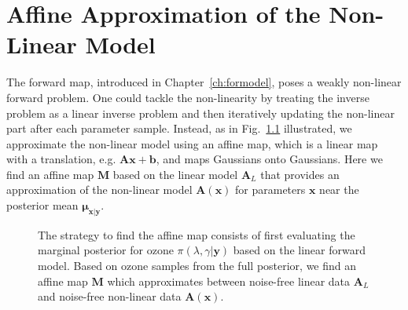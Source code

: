 \chapter{Affine Approximation of the Non-Linear Model}
\label{ch:affine}
\thispagestyle{empty}
\newcommand*{\vertbar}{\rule[-1ex]{0.5pt}{2.5ex}}
\newcommand*{\horzbar}{\rule[.5ex]{2.5ex}{0.5pt}}
The forward map, introduced in Chapter~\ref{ch:formodel}, poses a weakly non-linear forward problem.
One could tackle the non-linearity by treating the inverse problem as a linear inverse problem and then iteratively updating the non-linear part after each parameter sample.
Instead, as in Fig.~\ref{fig:affinStrat} illustrated, we approximate the non-linear model using an affine map, which is a linear map with a translation, e.g. $\bm{A}\bm{x} + \bm{b}$, and maps Gaussians onto Gaussians.
Here we find an affine map $\bm{M}$ based on the linear model $\bm{A}_L$ that provides an approximation of the non-linear model $\bm{A}(\bm{x})$ for parameters $\bm{x}$ near the posterior mean $\bm{\mu}_{\bm{x}|\bm{y}}$.
\begin{figure}[htb!]
	\centering
	\caption[Strategy to find affine map.]{The strategy to find the affine map consists of first evaluating the marginal posterior for ozone $\pi(\lambda , \gamma  | \bm{y})$ based on the linear forward model. Based on ozone samples from the full posterior, we find an affine map $\bm{M}$ which approximates between noise-free linear data $\bm{A}_L$ and noise-free non-linear data $\bm{A}(\bm{x})$.}
	\label{fig:affinStrat}
\end{figure}

